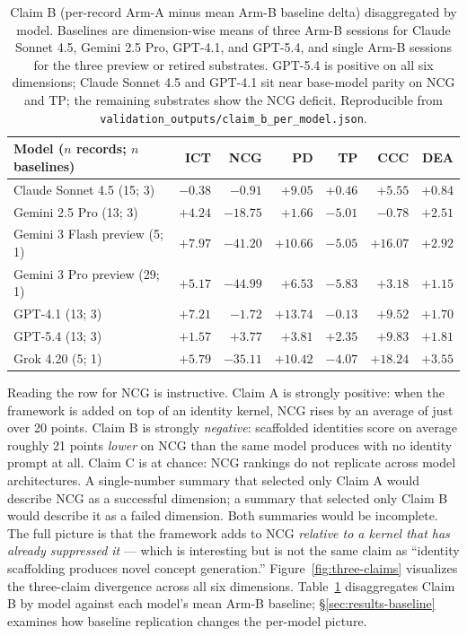 \documentclass[11pt]{article}
\begin{document}
\begin{table}[h]
\caption{Claim B (per-record Arm-A minus mean Arm-B baseline delta) disaggregated by model. Baselines are dimension-wise means of three Arm-B sessions for Claude Sonnet 4.5, Gemini 2.5 Pro, GPT-4.1, and GPT-5.4, and single Arm-B sessions for the three preview or retired substrates. GPT-5.4 is positive on all six dimensions; Claude Sonnet 4.5 and GPT-4.1 sit near base-model parity on NCG and TP; the remaining substrates show the NCG deficit. Reproducible from \texttt{validation\_outputs/claim\_b\_per\_model.json}.}
\label{tab:claim-b-per-model}
\centering
\small
\begin{tabular}{lrrrrrr}
\toprule
Model ($n$ records; $n$ baselines) & ICT & NCG & PD & TP & CCC & DEA \\
\midrule
Claude Sonnet 4.5 (15; 3)     & $-0.38$ & $-0.91$  & $+9.05$  & $+0.46$ & $+5.55$  & $+0.84$ \\
Gemini 2.5 Pro (13; 3)        & $+4.24$ & $-18.75$ & $+1.66$  & $-5.01$ & $-0.78$  & $+2.51$ \\
Gemini 3 Flash preview (5; 1) & $+7.97$ & $-41.20$ & $+10.66$ & $-5.05$ & $+16.07$ & $+2.92$ \\
Gemini 3 Pro preview (29; 1)  & $+5.17$ & $-44.99$ & $+6.53$  & $-5.83$ & $+3.18$  & $+1.15$ \\
GPT-4.1 (13; 3)               & $+7.21$ & $-1.72$  & $+13.74$ & $-0.13$ & $+9.52$  & $+1.70$ \\
GPT-5.4 (13; 3)               & $+1.57$ & $+3.77$  & $+3.81$  & $+2.35$ & $+9.83$  & $+1.81$ \\
Grok 4.20 (5; 1)              & $+5.79$ & $-35.11$ & $+10.42$ & $-4.07$ & $+18.24$ & $+3.55$ \\
\bottomrule
\end{tabular}
\end{table}

Reading the row for NCG is instructive. Claim A is strongly positive: when the framework is added on top of an identity kernel, NCG rises by an average of just over 20 points. Claim B is strongly \emph{negative}: scaffolded identities score on average roughly 21 points \emph{lower} on NCG than the same model produces with no identity prompt at all. Claim C is at chance: NCG rankings do not replicate across model architectures. A single-number summary that selected only Claim A would describe NCG as a successful dimension; a summary that selected only Claim B would describe it as a failed dimension. Both summaries would be incomplete. The full picture is that the framework adds to NCG \emph{relative to a kernel that has already suppressed it} --- which is interesting but is not the same claim as ``identity scaffolding produces novel concept generation.'' Figure~\ref{fig:three-claims} visualizes the three-claim divergence across all six dimensions. Table~\ref{tab:claim-b-per-model} disaggregates Claim B by model against each model's mean Arm-B baseline; \S\ref{sec:results-baseline} examines how baseline replication changes the per-model picture.
\end{document}
